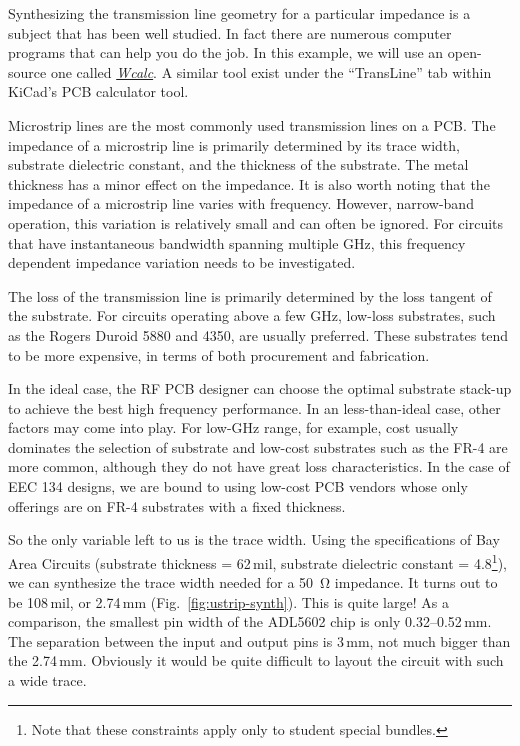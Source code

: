 \documentclass[12pt,letterpaper]{scrartcl}
\begin{document}
Synthesizing the transmission line geometry for a particular impedance is a subject that has been well studied. In fact there are numerous computer programs that can help you do the job. In this example, we will use an open-source one called \href{http://wcalc.sourceforge.net/}{\textit{Wcalc}}. A similar tool exist under the ``TransLine'' tab within KiCad's PCB calculator tool. 

Microstrip lines are the most commonly used transmission lines on a PCB. The impedance of a microstrip line is primarily determined by its trace width, substrate dielectric constant, and the thickness of the substrate. The metal thickness has a minor effect on the impedance. It is also worth noting that the impedance of a microstrip line varies with frequency. However, narrow-band operation, this variation is relatively small and can often be ignored. For circuits that have instantaneous bandwidth spanning multiple GHz, this frequency dependent impedance variation needs to be investigated.  

The loss of the transmission line is primarily determined by the loss tangent of the substrate. For circuits operating above a few GHz, low-loss substrates, such as the Rogers Duroid 5880 and 4350, are usually preferred. These substrates tend to be more expensive, in terms of both procurement and fabrication. 

In the ideal case, the RF PCB designer can choose the optimal substrate stack-up to achieve the best high frequency performance. In an less-than-ideal case, other factors may come into play. For low-GHz range, for example, cost usually dominates the selection of substrate and low-cost substrates such as the FR-4 are more common, although they do not have great loss characteristics. In the case of EEC 134 designs, we are bound to using low-cost PCB vendors whose only offerings are on FR-4 substrates with a fixed thickness. 

So the only variable left to us is the trace width. Using the specifications of Bay Area Circuits (substrate thickness = 62\,mil, substrate dielectric constant = 4.8\footnote{Note that these constraints apply only to student special bundles.}), we can synthesize the trace width needed for a \SI{50}{\ohm} impedance. It turns out to be 108\,mil, or 2.74\,mm (Fig.~\ref{fig:ustrip-synth}). This is quite large! As a comparison, the smallest pin width of the ADL5602 chip is only 0.32--0.52\,mm. The separation between the input and output pins is 3\,mm, not much bigger than the 2.74\,mm. Obviously it would be quite difficult to layout the circuit with such a wide trace. 
\end{document}
